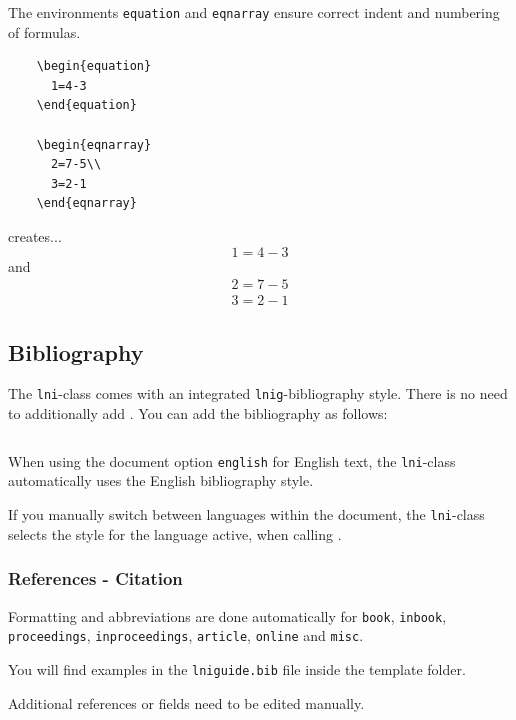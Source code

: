 \documentclass[english]{lni}
\begin{document}
The environments \texttt{equation} and \texttt{eqnarray} ensure correct indent and numbering of formulas.

\begin{verbatim}
	\begin{equation}
	  1=4-3
	\end{equation}

	\begin{eqnarray}
	  2=7-5\\
	  3=2-1
	\end{eqnarray}
\end{verbatim}

creates...
\begin{equation}
  1=4-3
\end{equation}
and
\begin{eqnarray}
  2=7-5\\
  3=2-1
\end{eqnarray}

\subsection{Bibliography}
The \texttt{lni}-class comes with an integrated \texttt{lnig}-bibliography style. There is no need to additionally add \verb||. You can add the bibliography as follows:

\begin{verbatim}

\end{verbatim}

When using the document option \texttt{english} for English text, the \texttt{lni}-class automatically uses the English bibliography style. 

If you manually switch between languages within the document, the \texttt{lni}-class selects the style for the language active, when calling \verb||.

\subsubsection{References - Citation}

Formatting and abbreviations are done automatically for \texttt{book}, \texttt{inbook}, \texttt{proceedings}, \texttt{inproceedings}, \texttt{article}, \texttt{online} and \texttt{misc}. 

You will find examples in the \texttt{lniguide.bib} file inside the template folder.

Additional references or fields need to be edited manually.
\end{document}
